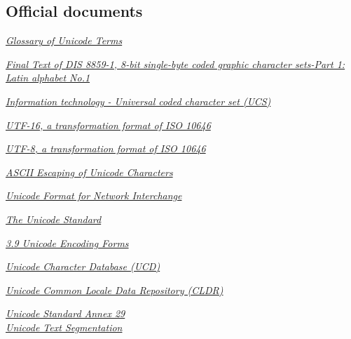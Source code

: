 \documentclass[b4paper]{article}
\begin{document}
\subsection{Official documents}
\renewcommand{\refname}{References}

\begin{thebibliography}{20}
\href{https://unicode.org/glossary/}%
{\textit{Glossary of Unicode Terms}}

\href{https://www.open-std.org/JTC1/sc2/wg3/docs/n411.pdf}%
{\textit{Final Text of DIS 8859-1, 8-bit single-byte coded graphic character sets-Part 1: Latin alphabet No.1}}

\href{https://www.iso.org/standard/76835.html}%
{\textit{Information technology - Universal coded character set (UCS)}}

\href{https://datatracker.ietf.org/doc/rfc2781/}%
{\textit{UTF-16, a transformation format of ISO 10646}}

\href{https://datatracker.ietf.org/doc/rfc3629/}%
{\textit{UTF-8, a transformation format of ISO 10646}}

\href{https://datatracker.ietf.org/doc/rfc5137/}%
{\textit{ASCII Escaping of Unicode Characters}}

\href{https://datatracker.ietf.org/doc/rfc5198/}%
{\textit{Unicode Format for Network Interchange}}

\href{https://www.unicode.org/standard/standard.html}%
{\textit{The Unicode Standard}}

\href{https://www.unicode.org/versions/Unicode15.0.0/ch03.pdf#page=50}%
{\textit{3.9 Unicode Encoding Forms}}

\href{https://www.unicode.org/ucd/}%
{\textit{Unicode Character Database (UCD)}}

\href{https://cldr.unicode.org/}%
{\textit{Unicode Common Locale Data Repository (CLDR)}}

\href{https://www.unicode.org/reports/tr29/}%
{\textit{Unicode{\textregistered} Standard Annex 29\\ %
Unicode Text Segmentation}}


\end{thebibliography}
\end{document}
